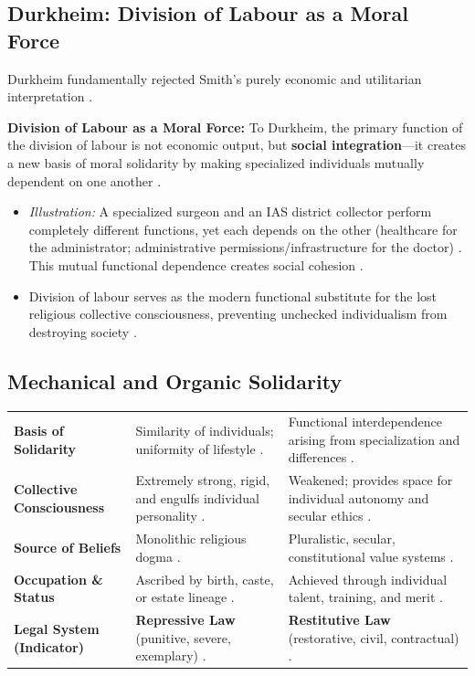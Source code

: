 \subsection{Durkheim: Division of Labour as a Moral Force}
Durkheim fundamentally rejected Smith's purely economic and utilitarian interpretation .

\begin{KeyConcept}
\textbf{Division of Labour as a Moral Force:} To Durkheim, the primary function of the division of labour is not economic output, but \textbf{social integration}---it creates a new basis of moral solidarity by making specialized individuals mutually dependent on one another .
\end{KeyConcept}

\begin{itemize}
    \item \textit{Illustration:} A specialized surgeon and an IAS district collector perform completely different functions, yet each depends on the other (healthcare for the administrator; administrative permissions/infrastructure for the doctor) . This mutual functional dependence creates social cohesion .
    \item Division of labour serves as the modern functional substitute for the lost religious collective consciousness, preventing unchecked individualism from destroying society .
\end{itemize}

\subsection{Mechanical and Organic Solidarity}

\vspace{6pt}
\noindent
\begin{tabularx}{\textwidth}{p{3.8cm} Y Y}
\toprule
{}
 &  &  \\
\midrule
\textbf{Basis of Solidarity} & Similarity of individuals; uniformity of lifestyle . & Functional interdependence arising from specialization and differences . \\
\textbf{Collective Consciousness} & Extremely strong, rigid, and engulfs individual personality . & Weakened; provides space for individual autonomy and secular ethics . \\
\textbf{Source of Beliefs} & Monolithic religious dogma . & Pluralistic, secular, constitutional value systems . \\
\textbf{Occupation \& Status} & Ascribed by birth, caste, or estate lineage . & Achieved through individual talent, training, and merit . \\
\textbf{Legal System (Indicator)} & \textbf{Repressive Law} (punitive, severe, exemplary) . & \textbf{Restitutive Law} (restorative, civil, contractual) . \\
\bottomrule
\end{tabularx}
\vspace{6pt}

